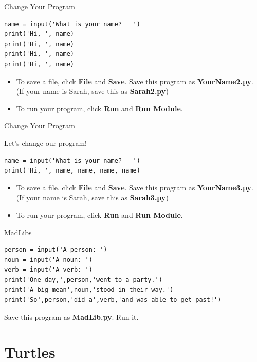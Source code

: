 \documentclass{beamer}
\begin{document}
\begin{frame}[fragile]{Change Your Program}

\begin{verbatim}
name = input('What is your name?   ')
print('Hi, ', name)
print('Hi, ', name)
print('Hi, ', name)
print('Hi, ', name)
\end{verbatim}

\begin{itemize}
\item To save a file, click \textbf{File} and \textbf{Save}. Save this program as \textbf{YourName2.py}. (If your name is Sarah, save this as \textbf{Sarah2.py})
\item To run your program, click \textbf{Run} and \textbf{Run Module}.
\end{itemize}
\end{frame}

\begin{frame}[fragile]{Change Your Program}

Let's change our program!

\begin{verbatim}
name = input('What is your name?   ')
print('Hi, ', name, name, name, name)
\end{verbatim}

\begin{itemize}
\item To save a file, click \textbf{File} and \textbf{Save}. Save this program as \textbf{YourName3.py}. (If your name is Sarah, save this as \textbf{Sarah3.py})
\item To run your program, click \textbf{Run} and \textbf{Run Module}.
\end{itemize}
\end{frame}

\begin{frame}[fragile]{MadLibs}

\begin{verbatim}
person = input('A person: ')
noun = input('A noun: ')
verb = input('A verb: ')
print('One day,',person,'went to a party.')
print('A big mean',noun,'stood in their way.')
print('So',person,'did a',verb,'and was able to get past!')
\end{verbatim}

Save this program as \textbf{MadLib.py}. Run it.
\end{frame}

\section{Turtles}
\end{document}
